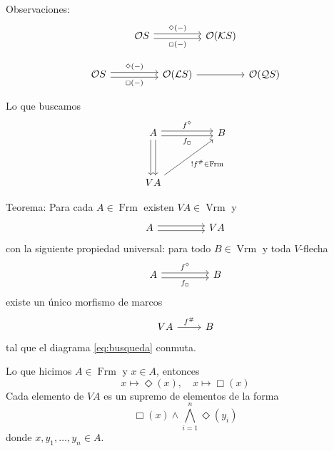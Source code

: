 \documentclass[compress,12pt]{beamer}
\DeclareMathOperator{\Vrm}{Vrm}
\DeclareMathOperator{\Frm}{Frm}
\begin{document}
\begin{frame}[fragile]{Observaciones:}
\[\begin{tikzcd}
	{\mathcal{O}S} && {\mathcal{O}(\mathcal{K}S)}
	\arrow["{\Diamond(-)}", shift left, from=1-1, to=1-3]
	\arrow["{\Box(-)}"', shift right, from=1-1, to=1-3]
\end{tikzcd}\]

\[\begin{tikzcd}
	{\mathcal{O}S} && {\mathcal{O}(\mathcal{L}S)} && {\mathcal{O}(\mathcal{Q}S)}
	\arrow["{\Diamond(-)}", shift left, from=1-1, to=1-3]
	\arrow["{\Box(-)}"', shift right, from=1-1, to=1-3]
	\arrow[from=1-3, to=1-5]
\end{tikzcd}\]

Lo que buscamos
\begin{equation}\label{eq:busqueda}
\begin{tikzcd}
	A && B \\
	\\
	VA
	\arrow["{f^\Diamond}", shift left, from=1-1, to=1-3]
	\arrow["{f_\Box}"', shift right, from=1-1, to=1-3]
	\arrow[shift left, from=1-1, to=3-1]
	\arrow[shift right, from=1-1, to=3-1]
	\arrow["{!f^\#\in \Frm}"', from=3-1, to=1-3]
\end{tikzcd}
\end{equation}
\end{frame}

\begin{frame}[fragile]
\begin{block}{Teorema:}
Para cada $A\in \Frm$ existen $VA\in \Vrm$ y 
\[\begin{tikzcd}
	A && VA
	\arrow[shift left, from=1-1, to=1-3]
	\arrow[shift right, from=1-1, to=1-3]
\end{tikzcd}\]
con la siguiente propiedad universal:
para todo $B\in \Vrm$ y toda $V$-flecha
\[\begin{tikzcd}
	A && B
	\arrow["{f^\Diamond}", shift left, from=1-1, to=1-3]
	\arrow["{f_\Box}"', shift right, from=1-1, to=1-3]
\end{tikzcd}\]
existe un único morfismo de marcos 
\[\begin{tikzcd}
	VA & B
	\arrow["{f^\#}", from=1-1, to=1-2]
\end{tikzcd}\]
tal que el diagrama \eqref{eq:busqueda} conmuta.
\end{block}
\end{frame}

\begin{frame}{Lo que hicimos}
$A\in \Frm$ y $x\in A$, entonces
\[
x\mapsto \Diamond(x), \quad x\mapsto \Box(x)
\]
Cada elemento de $VA$ es un supremo de elementos de la forma
\[
\Box(x)\wedge \bigwedge_{i=1}^n \Diamond(y_i)
\]
donde $x, y_1,\dots,y_n\in A$.
\end{frame}
\end{document}
